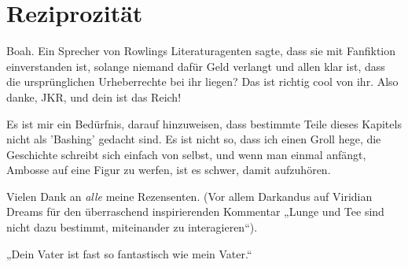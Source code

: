 \chapter{Reziprozität}

\begin{chapterOpeningAuthorNote}
Boah. Ein Sprecher von Rowlings Literaturagenten sagte, dass sie mit Fanfiktion einverstanden ist, solange niemand dafür Geld verlangt und allen klar ist, dass die ursprünglichen Urheberrechte bei ihr liegen? Das ist richtig cool von ihr. Also danke, JKR, und dein ist das Reich!

Es ist mir ein Bedürfnis, darauf hinzuweisen, dass bestimmte Teile dieses Kapitels nicht als 'Bashing' gedacht sind. Es ist nicht so, dass ich einen Groll hege, die Geschichte schreibt sich einfach von selbst, und wenn man einmal anfängt, Ambosse auf eine Figur zu werfen, ist es schwer, damit aufzuhören.


Vielen Dank an \emph{alle} meine Rezensenten. (Vor allem Darkandus auf Viridian Dreams für den überraschend inspirierenden Kommentar „Lunge und Tee sind nicht dazu bestimmt, miteinander zu interagieren“).
\end{chapterOpeningAuthorNote}
\begin{chapterOpeningQuote}
„Dein Vater ist fast so fantastisch wie mein Vater.“
\end{chapterOpeningQuote}

